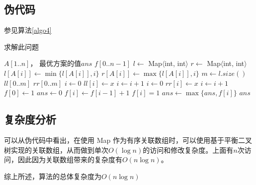 \documentclass[UTF8]{ctexart}
\begin{document}
    \subsection*{伪代码}
        参见算法\ref{algo4}
        \begin{algorithm}
            \caption{求解此问题}
            \begin{algorithmic}[1]
                \Require $A[1..n]$，
                \Ensure 最优方案的值$ans$
                    \State $f[0..n-1]$
                    \State $l \gets$ Map$\langle$int, int$\rangle$
                    \State $r \gets$ Map$\langle$int, int$\rangle$
                        \State $l[A[i]]\gets \min{\{l[A[i]], i\}}$
                        \State $r[A[i]]\gets \max{\{l[A[i]], i\}}$
                    \EndFor
                    \State $m \gets l.size()$
                    \State $ll[0..m]$
                    \State $rr[0..m]$
                    \State $i \gets 0$
                        \State $ll[i]\gets x$
                        \State $i \gets i+1$
                    \EndFor
                    \State $i \gets 0$
                        \State $rr[i]\gets x$
                        \State $i \gets i+1$
                    \EndFor
                    \State $f[0] \gets 1$
                    \State $ans \gets 0$
                            \State $f[i] \gets f[i-1]+1$
                        \Else
                            \State $f[i] = 1$
                        \EndIf
                        \State $ans \gets \max{\{ans, f[i]\}}$
                    \EndFor
                    \State \Return $ans$
                \EndFunction
            \end{algorithmic}
            \label{algo4}
        \end{algorithm}    
        
    \subsection*{复杂度分析}
        可以从伪代码中看出，在使用 Map 作为有序关联数组时，可以使用基于平衡二叉树实现的关联数组，从而做到单次$O(\log n)$的访问和修改复杂度。上面有$n$次访问，因此因为关联数组带来的复杂度有$O(n\log n)$。

        综上所述，算法的总体复杂度为$O(n \log n)$
\end{document}
